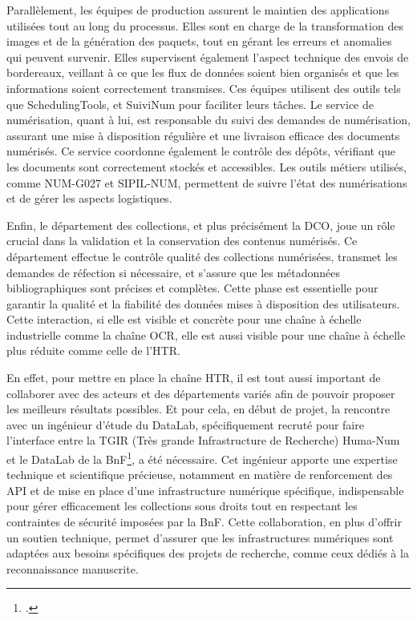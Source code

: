 \documentclass[a4paper,12pt,twoside]{book}
\begin{document}
	Parallèlement, les équipes de production assurent le maintien des applications utilisées tout au long du processus. Elles sont en charge de la transformation des images et de la génération des paquets, tout en gérant les erreurs et anomalies qui peuvent survenir. Elles supervisent également l’aspect technique des envois de bordereaux, veillant à ce que les flux de données soient bien organisés et que les informations soient correctement transmises. Ces équipes utilisent des outils tels que SchedulingTools, et SuiviNum pour faciliter leurs tâches. Le service de numérisation, quant à lui, est responsable du suivi des demandes de numérisation, assurant une mise à disposition régulière et une livraison efficace des documents numérisés. Ce service coordonne également le contrôle des dépôts, vérifiant que les documents sont correctement stockés et accessibles. Les outils métiers utilisés, comme NUM-G027 et SIPIL-NUM, permettent de suivre l’état des numérisations et de gérer les aspects logistiques.
	
	Enfin, le département des collections, et plus précisément la DCO, joue un rôle crucial dans la validation et la conservation des contenus numérisés. Ce département effectue le contrôle qualité des collections numérisées, transmet les demandes de réfection si nécessaire, et s’assure que les métadonnées bibliographiques sont précises et complètes. Cette phase est essentielle pour garantir la qualité et la fiabilité des données mises à disposition des utilisateurs.
	\\
	
	Cette interaction, si elle est visible et concrète pour une chaîne à échelle industrielle comme la chaîne OCR, elle est aussi visible pour une chaîne à échelle plus réduite comme celle de l’HTR. 
	
	En effet, pour mettre en place la chaîne HTR, il est tout aussi important de collaborer avec des acteurs et des départements variés afin de pouvoir proposer les meilleurs résultats possibles. Et pour cela, en début de projet, la rencontre avec un ingénieur d’étude du DataLab, spécifiquement recruté pour faire l’interface entre la TGIR (Très grande Infrastructure de Recherche) Huma-Num et le DataLab de la BnF\footcite{carlin_bnf_2021}, a été nécessaire. Cet ingénieur apporte une expertise technique et scientifique précieuse, notamment en matière de renforcement des API et de mise en place d’une infrastructure numérique spécifique, indispensable pour gérer efficacement les collections sous droits tout en respectant les contraintes de sécurité imposées par la BnF. Cette collaboration, en plus d’offrir un soutien technique, permet d’assurer que les infrastructures numériques sont adaptées aux besoins spécifiques des projets de recherche, comme ceux dédiés à la reconnaissance manuscrite.
	
\end{document}
